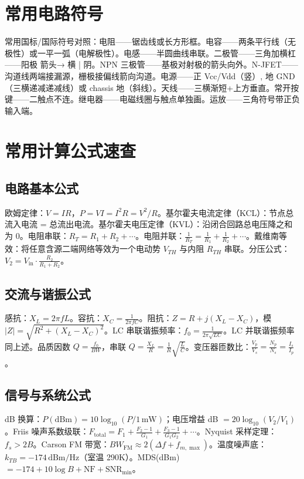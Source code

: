 \documentclass[12pt,UTF8]{ctexbook}
\begin{document}
\chapter{常用电路符号}

常用国标/国际符号对照：电阻——锯齿线或长方形框。电容——两条平行线（无极性）或一平一弧（电解极性）。电感——半圆曲线串联。二极管——三角加横杠——阳极 箭头→ 横 | 阴。NPN 三极管——基极对射极的箭头向外。N-JFET——沟道线两端接漏源，栅极接偏线箭向沟道。电源——正 Vcc/Vdd（竖）, 地 GND（三横递减递减线）或 chassis 地（斜线）。天线——三横渐短+上方垂直。常开按键——二触点不连。继电器——电磁线圈与触点单独画。运放——三角符号带正负输入端。

\chapter{常用计算公式速查}
\label{app:formulas}

\section{电路基本公式}

欧姆定律：$V = I R$，$P = V I = I^2 R = V^2/R$。基尔霍夫电流定律（KCL）：节点总流入电流 = 总流出电流。基尔霍夫电压定律（KVL）：沿闭合回路总电压降之和为 0。电阻串联：$R_T = R_1+R_2+\cdots$。电阻并联：$\frac{1}{R_T}=\frac{1}{R_1}+\frac{1}{R_2}+\cdots$。戴维南等效：将任意含源二端网络等效为一个电动势 $V_{TH}$ 与内阻 $R_{TH}$ 串联。分压公式：$V_2 = V_{\mathrm{in}} \cdot \frac{R_2}{R_1+R_2}$。

\section{交流与谐振公式}

感抗：$X_L = 2\pi f L$。容抗：$X_C = \frac{1}{2\pi f C}$。阻抗：$Z = R + j(X_L - X_C)$，模 $|Z| = \sqrt{R^2+(X_L-X_C)^2}$。LC 串联谐振频率：$f_0 = \frac{1}{2\pi\sqrt{LC}}$。LC 并联谐振频率同上述。品质因数 $Q = \frac{f_0}{BW}$，串联 $Q = \frac{X_L}{R} = \frac{1}{R}\sqrt{\frac{L}{C}}$。变压器匝数比：$\frac{V_p}{V_s} = \frac{N_p}{N_s} = \frac{I_s}{I_p}$。

\section{信号与系统公式}

dB 换算：$P(\mathrm{dBm}) = 10\log_{10}(P/1\,\mathrm{mW})$；电压增益 dB $= 20\log_{10}(V_2/V_1)$。Friis 噪声系数级联：$F_{\mathrm{total}} = F_1 + \frac{F_2-1}{G_1} + \frac{F_3-1}{G_1 G_2} + \cdots$。Nyquist 采样定理：$f_s > 2B$。Carson FM 带宽：$BW_{\mathrm{FM}} \approx 2(\Delta f + f_{m,\max})$。温度噪声底：$k_{TB} = -174\,\mathrm{dBm/Hz}$（室温 290K）。MDS(dBm) $= -174 + 10\log B + \mathrm{NF} + \mathrm{SNR}_{\min}$。
\end{document}
